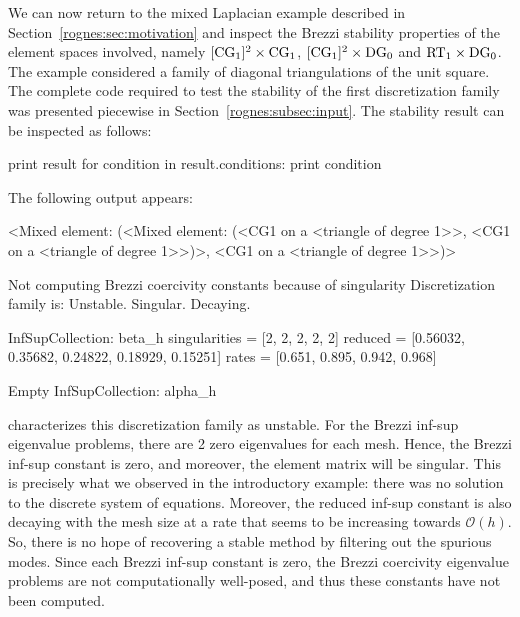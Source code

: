 We can now return to the mixed Laplacian example described in
Section~\ref{rognes:sec:motivation} and inspect the Brezzi stability
properties of the element spaces involved, namely
$[\mathrm{CG}_{1}]^{2} \times \mathrm{CG}_{1}$, $[\mathrm{CG}_{1}]^{2}
\times \mathrm{DG}_{0}$ and $\mathrm{RT}_{1} \times \mathrm{DG}_{0}$. The
example considered a family of diagonal triangulations of the unit
square. The complete code required to test the stability of the first
discretization family was presented piecewise in
Section~\ref{rognes:subsec:input}. The stability result can be
inspected as follows:
\begin{python}
print result
for condition in result.conditions:
    print condition
\end{python}
The following output appears:
\begin{progoutput}
<Mixed element: (<Mixed element: (<CG1 on a <triangle of degree 1>>,
<CG1 on a <triangle of degree 1>>)>, <CG1 on a <triangle of degree 1>>)>

Not computing Brezzi coercivity constants because of singularity
Discretization family is: Unstable. Singular. Decaying.

InfSupCollection: beta_h
singularities =  [2, 2, 2, 2, 2]
reduced =        [0.56032, 0.35682, 0.24822, 0.18929, 0.15251]
rates  =         [0.651, 0.895, 0.942, 0.968]

Empty InfSupCollection: alpha_h
\end{progoutput}
\rognesascot{} characterizes this discretization family as
unstable. For the Brezzi inf-sup eigenvalue problems, there are 2 zero
eigenvalues for each mesh. Hence, the Brezzi inf-sup constant is zero,
and moreover, the element matrix will be singular. This is precisely
what we observed in the introductory example: there was no solution to
the discrete system of equations. Moreover, the reduced inf-sup
constant is also decaying with the mesh size at a rate that seems to
be increasing towards $\mathcal{O}(h)$. So, there is no hope of
recovering a stable method by filtering out the spurious modes. Since
each Brezzi inf-sup constant is zero, the Brezzi coercivity eigenvalue
problems are not computationally well-posed, and thus these constants
have not been computed.

